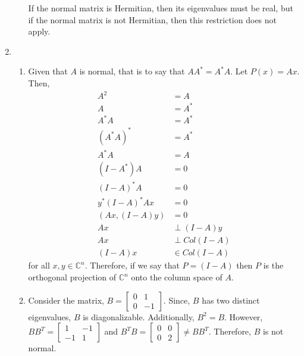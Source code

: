 \documentclass{article}
\begin{document}
\begin{enumerate}
\begin{enumerate}
        If the normal matrix is Hermitian, then its eigenvalues must be real, but if the normal matrix is not Hermitian, then this restriction does not apply.
        
    \end{enumerate}
    
    \item
    
    \begin{enumerate}
        \item 
        
        Given that $A$ is normal, that is to say that $AA^*=A^*A.$ Let $P(x)=Ax$. Then, 
        \begin{align*}
            A^2&=A\\
            A&=A^*\\
            A^*A&=A^*\\
            (A^*A)^*&=A^*\\
            A^*A&=A\\
            (I-A^*)A&=0\\
            (I-A)^*A&=0\\
            y^*(I-A)^*Ax&=0\\
            (Ax,(I-A)y)&=0\\
            Ax &\perp (I-A)y\\
            Ax &\perp Col(I-A)\\
            (I-A)x &\in Col(I-A)
        \end{align*} for all $x,y\in \mathbb{C}^n$. Therefore, if we say that $P=(I-A)$ then $P$ is the orthogonal projection of $\mathbb{C}^n$ onto the column space of $A.$
        
        \item
        
        Consider the matrix, $B=\begin{bmatrix}
        0 & 1\\
        0 & -1
        \end{bmatrix}$. Since, $B$ has two distinct eigenvalues, $B$ is diagonalizable. Additionally, $B^2=B$. However, $BB^T=\begin{bmatrix}
        1 & -1\\
        -1 & 1
        \end{bmatrix}$ and $B^TB=\begin{bmatrix}
        0 & 0\\
        0 & 2
        \end{bmatrix} \neq BB^T$. Therefore, $B$ is not normal.
        

\end{enumerate}
\end{enumerate}
\end{document}
